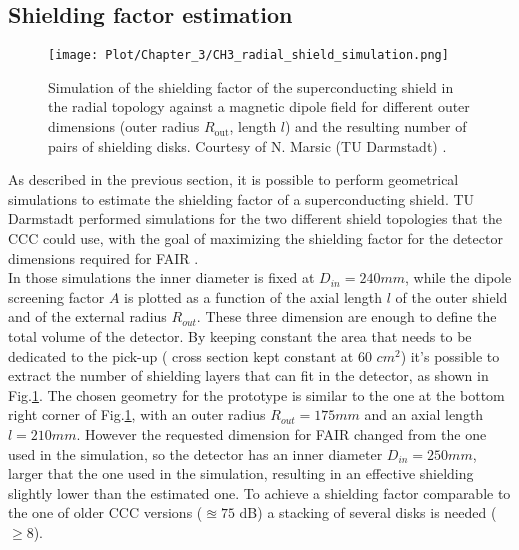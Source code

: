 \documentclass[12pt,a4paper]{report}
\begin{document}
        \subsection{Shielding factor estimation}
        \begin{figure} [H]
        	\centering
        	\texttt{[image: Plot/Chapter\_3/CH3\_radial\_shield\_simulation.png]}
        	\caption{\small{Simulation of the shielding factor of the superconducting shield in the radial topology against a magnetic dipole field for different outer dimensions (outer radius \( R_{\text{out}} \), length \( l \)) and the resulting number of pairs of shielding disks. Courtesy of N. Marsic (TU Darmstadt) \cite{Marsic_shield}.
        	}}
        	\label{CH3_radial_shield_simulation}
        \end{figure}
        As described in the previous section, it is possible to perform geometrical simulations to estimate the shielding factor of a superconducting shield. TU Darmstadt performed simulations for the two different shield topologies that the CCC could use, with the goal of maximizing the shielding factor for the detector dimensions required for FAIR \cite{Marsic} \cite{DEGERSEM_shield} \cite{Marsic_shield}.\\
        In those simulations the inner diameter is fixed at $D_{in}=240 mm$, while the dipole screening factor $A$ is plotted as a function of the axial length $l$ of the outer shield and of the external radius $R_{out}$. These three dimension are enough to define the total volume of the detector. By keeping constant the area that needs to be dedicated to the pick-up ( cross section kept constant at 60 $cm^2$) it's possible to extract the number of shielding layers that can fit in the detector, as shown in Fig.\ref{CH3_radial_shield_simulation}. The chosen geometry for the prototype is similar to the one at the bottom right corner of Fig.\ref{CH3_radial_shield_simulation}, with an outer radius $R_{out} = 175 mm$ and an axial length $l=210 mm$. However the requested dimension for FAIR changed from the one used in the simulation, so the detector has an inner diameter $D_{in}=250 mm$, larger that the one used in the simulation, resulting in an effective shielding slightly lower than the estimated one. To achieve a shielding factor comparable to the one of older CCC versions ($\approxeq 75$ dB)  a stacking of several disks is needed ($\geq 8$).
\end{document}
